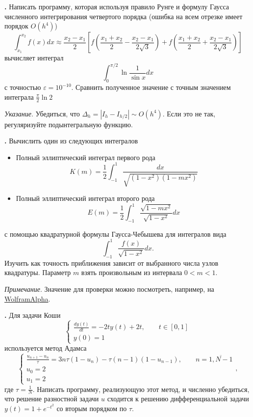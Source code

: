 \documentclass[12pt]{article}
\newcounter{task}
\newcommand{\problem}{\par\textbf{\stepcounter{task}\thetask. }}
\begin{document}
\problem Написать программу, которая используя правило Рунге и формулу
Гаусса численного интегрирования четвертого порядка (ошибка на всем
отрезке имеет порядок $O(h^4)$)
\[
\int_{x_1}^{x_2} f(x) dx \approx \frac{x_2 - x_1}{2}\left[
f\left(\frac{x_1+x_2}{2} - \frac{x_2 - x_1}{2\sqrt{3}}\right) +
f\left(\frac{x_1+x_2}{2} + \frac{x_2 - x_1}{2\sqrt{3}}\right)
\right]
\]
вычисляет интеграл
\[
\int_0^{\pi/2} \ln \frac{1}{\sin x} dx
\]
с точностью $\varepsilon = 10^{-10}$. Сравнить полученное значение с точным
значением интеграла $\frac{\pi}{2} \ln 2$

\emph{Указание}. Убедиться, что $\Delta_h = |I_h - I_{h/2}| \sim O(h^4)$. Если это
не так, регуляризуйте подынтегральную функцию.

\problem Вычислить один из следующих интегралов
\begin{itemize}
\item Полный эллиптический интеграл первого рода
\[
K(m) = \frac{1}{2}\int_{-1}^1 \frac{dx}{\sqrt{(1-x^2)(1 - m x^2)}}
\]
\item Полный эллиптический интеграл второго рода
\[
E(m) = \frac{1}{2}\int_{-1}^1 \frac{\sqrt{1 - m x^2}}{\sqrt{1-x^2}}dx
\]
\end{itemize}
с помощью квадратурной формулы Гаусса-Чебышева для интегралов вида
\[
\int_{-1}^1 \frac{f(x)}{\sqrt{1-x^2}} dx.
\]
Изучить как точность приближения зависит от выбранного числа узлов квадратуры.
Параметр $m$ взять произвольным из интервала $0 < m < 1$. 

\emph{Примечание}. Значение для проверки можно посмотреть, например, на \href{http://www.wolframalpha.com/input/?i=K(1\%2F2)}{WolframAlpha}.

\problem Для задачи Коши
\[
\begin{cases}
\displaystyle\frac{dy(t)}{dt} = -2t y(t) + 2 t, \qquad t \in [0,1]\\
y(0) = 1
\end{cases}
\]
используется метод Адамса
\[
\begin{cases}
\displaystyle\frac{u_{n+1} - u_{n}}{\tau} = 3 n \tau(1 - u_n) - \tau  (n-1)(1 - u_{n-1}), \qquad n =
\overline{1, N-1}\\
u_0 = 2\\
u_1 = 2
\end{cases},
\]
где $\tau = \frac{1}{N}$.
Написать программу, реализующую этот метод, и численно убедиться, что решение
разностной задачи $u$ сходится к решению дифференциальной задачи $y(t) = 1 + e^{-t^2}$ со вторым порядком
по $\tau$.
\end{document}
